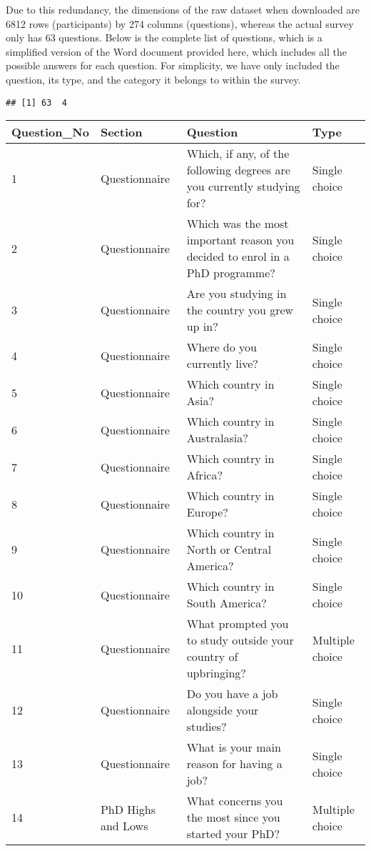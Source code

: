 \documentclass[
]{article}
\begin{document}
Due to this redundancy, the dimensions of the raw dataset when
downloaded are 6812 rows (participants) by 274 columns (questions),
whereas the actual survey only has 63 questions. Below is the complete
list of questions, which is a simplified version of the Word document
provided here, which includes all the possible answers for each
question. For simplicity, we have only included the question, its type,
and the category it belongs to within the survey.

\begin{verbatim}
## [1] 63  4
\end{verbatim}

\begin{table}[H]
\centering
\begin{tabular}{l|l|l|l}
\hline
Question\_No & Section & Question & Type\\
\hline
1 & Questionnaire & Which, if any, of the following degrees are you currently studying for? & Single choice\\
\hline
2 & Questionnaire & Which was the most important reason you decided to enrol in a PhD programme? & Single choice\\
\hline
3 & Questionnaire & Are you studying in the country you grew up in? & Single choice\\
\hline
4 & Questionnaire & Where do you currently live? & Single choice\\
\hline
5 & Questionnaire & Which country in Asia? & Single choice\\
\hline
6 & Questionnaire & Which country in Australasia? & Single choice\\
\hline
7 & Questionnaire & Which country in Africa? & Single choice\\
\hline
8 & Questionnaire & Which country in Europe? & Single choice\\
\hline
9 & Questionnaire & Which country in North or Central America? & Single choice\\
\hline
10 & Questionnaire & Which country in South America? & Single choice\\
\hline
11 & Questionnaire & What prompted you to study outside your country of upbringing? & Multiple choice\\
\hline
12 & Questionnaire & Do you have a job alongside your studies? & Single choice\\
\hline
13 & Questionnaire & What is your main reason for having a job? & Single choice\\
\hline
14 & PhD Highs and Lows & What concerns you the most since you started your PhD? & Multiple choice\\

\end{tabular}
\end{table}
\end{document}
